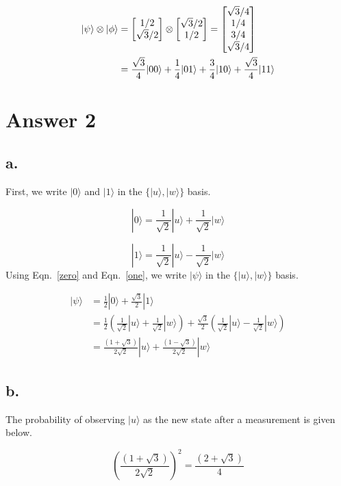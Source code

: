 \documentclass[12pt]{article}
\begin{document}
\begin{equation}
\begin{split}
|\psi\rangle \otimes |\phi\rangle & = \begin{bmatrix}$$1/2$$\\$$\sqrt{3}/2$$\end{bmatrix} \otimes \begin{bmatrix}$$\sqrt{3}/2$$\\$$1/2$$\end{bmatrix}  = \begin{bmatrix}$$\sqrt{3}/4$$\\$$1/4$$\\$$3/4$$\\$$\sqrt{3}/4$$\end{bmatrix}\\
& = \frac{\sqrt{3}}{4}|00\rangle + \frac{1}{4}|01\rangle + \frac{3}{4}|10\rangle + \frac{\sqrt{3}}{4}|11\rangle
\end{split}
\end{equation}


\section*{Answer 2} 

\subsection*{a.} 

First, we write $|0\rangle$ and $|1\rangle$ in the $\{|u\rangle, |w\rangle\}$ basis.

\begin{equation}\label{zero}
|0\rangle = \frac{1}{\sqrt{2}}|u\rangle + \frac{1}{\sqrt{2}}|w\rangle
\end{equation}

\begin{equation}\label{one}
|1\rangle = \frac{1}{\sqrt{2}}|u\rangle - \frac{1}{\sqrt{2}}|w\rangle
\end{equation}
Using Eqn.~\ref{zero} and Eqn.~\ref{one}, we write $|\psi\rangle$ in the $\{|u\rangle, |w\rangle\}$ basis.

\begin{equation}
\begin{split}
|\psi\rangle & = \frac{1}{2}|0\rangle + \frac{\sqrt{3}}{2}|1\rangle \\
& = \frac{1}{2}\left( \frac{1}{\sqrt{2}}|u\rangle + \frac{1}{\sqrt{2}}|w\rangle \right) + \frac{\sqrt{3}}{2}\left( \frac{1}{\sqrt{2}}|u\rangle - \frac{1}{\sqrt{2}}|w\rangle \right)\\
& = \frac{\left( 1+\sqrt{3} \right)}{2\sqrt{2}}|u\rangle + \frac{\left(1-\sqrt{3}\right)}{2\sqrt{2}}|w\rangle
\end{split}
\end{equation}

\subsection*{b.}

The probability of observing $|u\rangle$ as the new state after a measurement is given below.

\begin{equation}
\left( \frac{\left( 1+\sqrt{3} \right)}{2\sqrt{2}} \right)^{2} = \frac{\left( 2+\sqrt{3} \right)}{4}
\end{equation}
\end{document}
